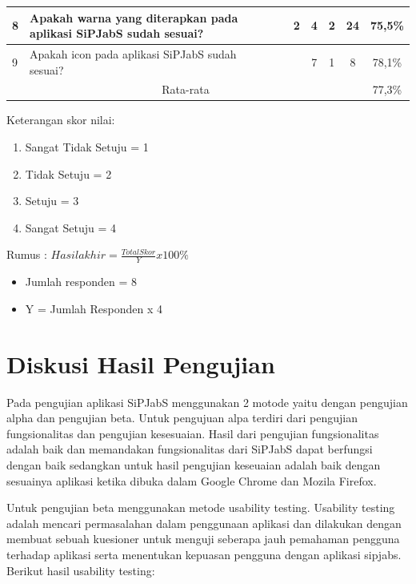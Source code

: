 \begin{table}
\begin{tabular}{ | p{5mm} | p{62mm} | c | c | c | c | c | c |}
		 8 & Apakah warna yang diterapkan pada aplikasi SiPJabS sudah sesuai? &  & 2 &4 & 2 & 24 & 75,5\% \\
		 \hline
		 
		 9 & Apakah icon pada aplikasi SiPJabS sudah sesuai? &  &  &7 & 1 & 8 & 78,1\% \\
		 \hline
		 
		 \multicolumn{7}{|c|}{Rata-rata} & 77,3\% \\ 
		 \hline
		 
	\end{tabular}
\end{table}

Keterangan skor nilai:
\begin{enumerate}
	\item Sangat Tidak Setuju = 1
	\item Tidak Setuju = 2
	\item Setuju = 3
	\item Sangat Setuju = 4
\end{enumerate}

Rumus :	
	$ Hasil akhir = \frac{Total Skor}{Y} x 100 \% $
	
\begin{itemize}
	
	\item Jumlah responden = 8
	\item Y = Jumlah Responden x 4
	
\end{itemize}


\section{Diskusi Hasil Pengujian}
Pada pengujian aplikasi SiPJabS menggunakan 2 motode yaitu dengan pengujian alpha dan pengujian beta. Untuk pengujuan alpa terdiri dari pengujian fungsionalitas dan pengujian kesesuaian. Hasil dari pengujian fungsionalitas adalah baik dan memandakan fungsionalitas dari SiPJabS dapat berfungsi dengan baik sedangkan untuk hasil pengujian keseuaian adalah baik dengan sesuainya aplikasi ketika dibuka dalam Google Chrome dan Mozila Firefox. 

Untuk pengujian beta menggunakan metode usability testing. Usability testing adalah mencari permasalahan dalam penggunaan aplikasi dan dilakukan dengan membuat sebuah kuesioner untuk menguji seberapa jauh pemahaman pengguna terhadap aplikasi serta menentukan kepuasan pengguna dengan aplikasi sipjabs. Berikut hasil usability testing: 


